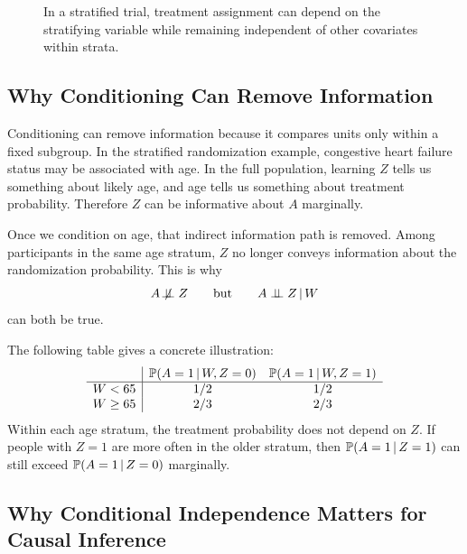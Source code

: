 \begin{figure}[H]
\centering
{}
\caption{In a stratified trial, treatment assignment can depend on the stratifying variable while remaining independent of other covariates within strata.}
\end{figure}

\subsection{Why Conditioning Can Remove Information}

Conditioning can remove information because it compares units only within a fixed subgroup. In the stratified randomization example, congestive heart failure status may be associated with age. In the full population, learning $Z$ tells us something about likely age, and age tells us something about treatment probability. Therefore $Z$ can be informative about $A$ marginally.

Once we condition on age, that indirect information path is removed. Among participants in the same age stratum, $Z$ no longer conveys information about the randomization probability. This is why
\[
A\not\!\perp\!\!\!\perp Z
\qquad\text{but}\qquad
A\perp\!\!\!\perp Z\,\vert\, W
\]
can both be true.

The following table gives a concrete illustration:
\[
\begin{array}{c|cc}
& \mathbb{P}(A=1\,\vert\, W,Z=0) & \mathbb{P}(A=1\,\vert\, W,Z=1)\\
\hline
W<65 & 1/2 & 1/2\\
W\ge 65 & 2/3 & 2/3
\end{array}
\]
Within each age stratum, the treatment probability does not depend on $Z$. If people with $Z=1$ are more often in the older stratum, then $\mathbb{P}(A=1\,\vert\, Z=1)$ can still exceed $\mathbb{P}(A=1\,\vert\, Z=0)$ marginally.

\subsection{Why Conditional Independence Matters for Causal Inference}

